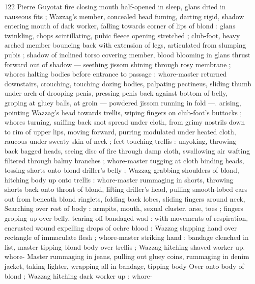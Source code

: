 122 Pierre Guyotat
fire closing mouth half-opened in sleep, glans dried in nauseous fits
; Wazzag's member, concealed head fuming, darting rigid, shadow
entering mouth of dark worker, falling towards corner of lips of
blond : glans twinkling, chops scintillating, pubic fleece opening
stretched ; club-foot, heavy arched member bouncing back with
extension of legs, articulated from slumping pubis ; shadow of
inclined torso covering member, blood blooming in glans thrust
forward out of shadow — seething jissom shining through rosy
membrane ; whores halting bodies before entrance to passage :
whore-master returned downstairs, crouching, touching dozing
bodies, palpating pectineus, sliding thumb under arch of drooping
penis, pressing penis back against bottom of belly, groping at gluey
balls, at groin — powdered jissom running in fold —. arising,
pointing Wazzag's head towards trellis, wiping fingers on club-foot's
buttocks ; whores turning, sniffing back snot spread under cloth,
from grimy nostrils down to rim of upper lips, moving forward,
purring modulated under heated cloth, raucous under sweaty skin of
neck ; feet touching trellis : unyoking, throwing back bagged heads,
seeing disc of fire through damp cloth, swallowing air wafting filtered
through balmy branches ; whore-master tugging at cloth binding
heads, tossing shorts onto blond driller's belly ; Wazzag grabbing
shoulders of blond, hitching body up onto trellis : whore-master
rummaging in shorts, throwing shorts back onto throat of blond,
lifting driller's head, pulling smooth-lobed ears out from beneath
blond ringlets, folding back lobes, sliding fingers around neck,
Searching over rest of body : armpits, mouth, sexual cluster. arse,
toes ; fingers groping up over belly, tearing off bandaged wad : with
movements of respiration, encrusted wound expelling drops of ochre
blood : Wazzag slapping hand over rectangle of immaculate flesh ;
whore-master striking hand ; bandage clenched in fist, master tipping
blond body over trellis ; Wazzag hitching shaved worker up. whore-
Master rummaging in jeans, pulling out gluey coins, rummaging in
denim jacket, taking lighter, wrapping all in bandage, tipping body
Over onto body of blond ; Wazzag hitching dark worker up : whore-

